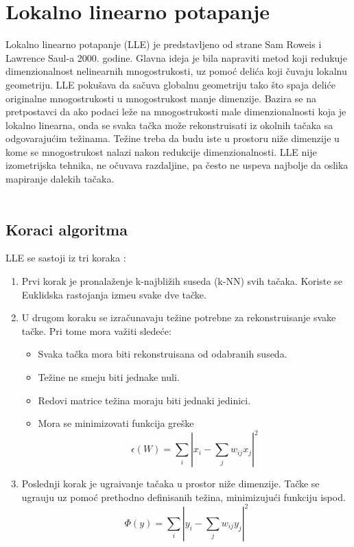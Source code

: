 \chapter{Lokalno linearno potapanje} 

Lokalno linearno potapanje (\textenglish{LLE}) je predstavljeno od strane \textenglish{Sam Roweis} i \textenglish{Lawrence Saul}-a 2000. godine. Glavna ideja je bila napraviti metod koji redukuje dimenzionalnost nelinearnih mnogostrukosti, uz pomo\' c deli\' ca koji \v cuvaju lokalnu geometriju. \textenglish{LLE} poku\v sava da sa\v cuva globalnu geometriju tako \v sto spaja deli\' ce originalne mnogostrukosti u mnogostrukost manje dimenzije.  Bazira se na pretpostavci da ako podaci le\v ze na mnogostrukosti male dimenzionalnosti koja je lokalno linearna, onda se svaka ta\v cka mo\v ze rekonstruisati iz okolnih ta\v caka sa odgovaraju\' cim te\v zinama. Te\v zine treba da budu iste u prostoru ni\v ze dimenzije u kome se mnogostrukost nalazi nakon redukcije dimenzionalnosti. \textenglish{LLE} nije izometrijska tehnika, ne o\v cuvava razdaljine, pa \v cesto ne uspeva najbolje da oslika mapiranje dalekih ta\v caka\cite{kratkoOSVakomAlg, lle}.\\
\\
\section{Koraci algoritma}
\textenglish{LLE} se sastoji iz tri koraka \cite{lleSteps}:
\begin{enumerate}
    \item Prvi korak je pronala\v zenje k-najbli\v zih suseda \textenglish{(k-NN)} svih ta\v caka.
    Koriste se Euklidska rastojanja izme\dj u svake dve ta\v cke. 

    \item U drugom koraku se izra\v cunavaju te\v zine potrebne za rekonstruisanje svake ta\v cke. Pri tome mora va\v ziti slede\' ce:
    \begin{itemize}
        \item Svaka ta\v cka mora biti rekonstruisana od odabranih suseda.
        \item Te\v zine ne smeju biti jednake nuli.
        \item Redovi matrice te\v zina moraju biti jednaki jedinici.
        \item Mora se minimizovati funkcija gre\v ske
        $$\epsilon(W) = \sum_{i}|x_{i} - \sum_{j}w_{ij}x_{j}|^{2}$$
    \end{itemize}
    \item Poslednji korak je ugra\dj ivanje ta\v caka u prostor ni\v ze dimenzije. Ta\v cke se ugra\dj uju uz pomo\' c prethodno definisanih te\v zina, minimizuju\' ci funkciju ispod.
    $$\Phi(y) = \sum_{i}|y_{i} - \sum_{j}w_{ij}y_{j}|^{2}$$
\end{enumerate}


